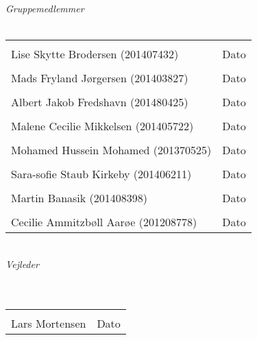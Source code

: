 \begin{vplace}[0.6]
{\large \textit{Gruppemedlemmer}}
\\
\\

\noindent \begin{tabular}{ll}
	\makebox[3.0in]{\hrulefill} & \makebox[1.5in]{\hrulefill}\\
	Lise Skytte Brodersen (201407432) & Dato\\[7ex]%
	\makebox[3in]{\hrulefill} & \makebox[1.5in]{\hrulefill}\\
	Mads Fryland J\o rgersen (201403827) & Dato\\[7ex]
	\makebox[3in]{\hrulefill} & \makebox[1.5in]{\hrulefill}\\
	Albert Jakob Fredshavn (201480425) & Dato\\[7ex]
	\makebox[3in]{\hrulefill} & \makebox[1.5in]{\hrulefill}\\
	Malene Cecilie Mikkelsen (201405722) & Dato\\[7ex]
	\makebox[3in]{\hrulefill} & \makebox[1.5in]{\hrulefill}\\
	Mohamed Hussein Mohamed (201370525) & Dato\\[7ex]
	\makebox[3in]{\hrulefill} & \makebox[1.5in]{\hrulefill}\\
	Sara-sofie Staub Kirkeby (201406211) & Dato\\[7ex]
	\makebox[3in]{\hrulefill} & \makebox[1.5in]{\hrulefill}\\
	Martin Banasik (201408398) & Dato\\[7ex]
	\makebox[3in]{\hrulefill} & \makebox[1.5in]{\hrulefill}\\
	Cecilie Ammitzb\o ll Aar\o e (201208778) & Dato\\[7ex]
	
\end{tabular}
\\
{\large \textit{Vejleder}}
\\
\\
\\
\noindent \begin{tabular}{ll}
	\makebox[3.0in]{\hrulefill} & \makebox[1.5in]{\hrulefill}\\
	Lars Mortensen & Dato\\[8ex]
\end{tabular}
\end{vplace}
